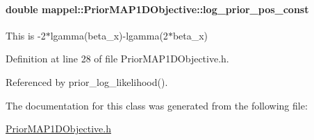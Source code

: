 \paragraph[{\texorpdfstring{log\+\_\+prior\+\_\+pos\+\_\+const}{log_prior_pos_const}}]{\setlength{\rightskip}{0pt plus 5cm}double mappel\+::\+Prior\+M\+A\+P1\+D\+Objective\+::log\+\_\+prior\+\_\+pos\+\_\+const\hspace{0.3cm}{\ttfamily [protected]}}\hypertarget{classmappel_1_1PriorMAP1DObjective_a9a1ba969ca0a2cd0a4eba7b4ae34156d}{}\label{classmappel_1_1PriorMAP1DObjective_a9a1ba969ca0a2cd0a4eba7b4ae34156d}
This is -\/2$\ast$lgamma(beta\+\_\+x)-\/lgamma(2$\ast$beta\+\_\+x) 

Definition at line 28 of file Prior\+M\+A\+P1\+D\+Objective.\+h.



Referenced by prior\+\_\+log\+\_\+likelihood().



The documentation for this class was generated from the following file\+:\begin{DoxyCompactItemize}
\item 
\hyperlink{PriorMAP1DObjective_8h}{Prior\+M\+A\+P1\+D\+Objective.\+h}\end{DoxyCompactItemize}
